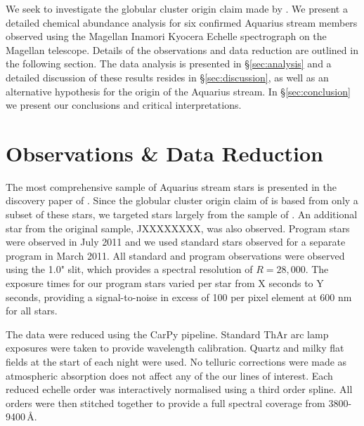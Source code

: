 \documentclass{emulateapj}
\begin{document}




We seek to investigate the globular cluster origin claim made by \citet{de_Boer;et-al_2012}. We present a detailed chemical abundance analysis for six confirmed Aquarius stream members observed using the Magellan Inamori Kyocera Echelle spectrograph \citep{Bernstein;et-al_2002} on the Magellan telescope. Details of the observations and data reduction are outlined in the following section. The data analysis is presented in \S\ref{sec:analysis} and a detailed discussion of these results resides in \S\ref{sec:discussion}, as well as an alternative hypothesis for the origin of the Aquarius stream. In \S\ref{sec:conclusion} we present our conclusions and critical interpretations.

\section{Observations \& Data Reduction}

The most comprehensive sample of Aquarius stream stars is presented in the discovery paper of \citet{Williams;et-al_2011}. Since the globular cluster origin claim of \citet{de_Boer;et-al_2012} is based from only a subset of these stars, we targeted stars largely from the sample of \citet{de_Boer;et-al_2012}. An additional star from the original \citet{Williams;et-al_2011} sample, JXXXXXXXX, was also observed. Program stars were observed in July 2011 and we used standard stars observed for a separate program in March 2011. All standard and program observations were observed using the 1.0" slit, which provides a spectral resolution of $R = 28,000$. The exposure times for our program stars varied per star from X seconds to Y seconds, providing a signal-to-noise in excess of 100 per pixel element at 600 nm for all stars.

The data were reduced using the CarPy pipeline. Standard ThAr arc lamp exposures were taken to provide wavelength calibration. Quartz and milky flat fields at the start of each night were used. No telluric corrections were made as atmospheric absorption does not affect any of the our lines of interest. Each reduced echelle order was interactively normalised using a third order spline. All orders were then stitched together to provide a full spectral coverage from 3800-9400\,\AA{}. 
\end{document}
